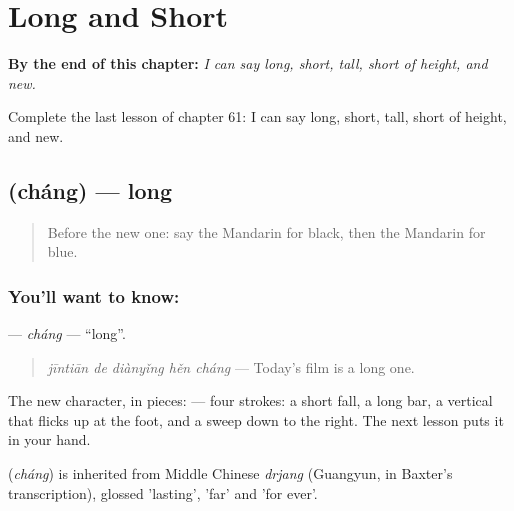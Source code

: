 
\chapter{Long and Short}
\label{ch:zh-long-and-short}

\begin{chapteropening}
\textbf{By the end of this chapter:} \emph{I can say long, short, tall, short of height, and new.}

Complete the last lesson of chapter 61: I can say long, short, tall, short of height, and new.
\end{chapteropening}

\section[\texorpdfstring{\zh{长} (cháng)}{长 (cháng)}]{ (cháng) — long}

\label{lesson:ZH-C61-chang}



\begin{quote}
Before the new one: say the Mandarin for black, then the Mandarin for blue.
\end{quote}

\subsection*{You'll want to know: }
\textbf{} — \emph{cháng} — \textquotedblleft{}long\textquotedblright{}.

\begin{quote}
\emph{jīntiān de diànyǐng hěn cháng} — Today's film is a long one.
\end{quote}

The new character, in pieces:  — four strokes: a short fall, a long bar, a vertical that flicks up at the foot, and a sweep down to the right. The next lesson puts it in your hand.

\begin{cousinweb}
\textbf{} (\emph{cháng}) is inherited from Middle Chinese \emph{drjang} (Guangyun, in Baxter's transcription), glossed 'lasting', 'far' and 'for ever'.
\end{cousinweb}

